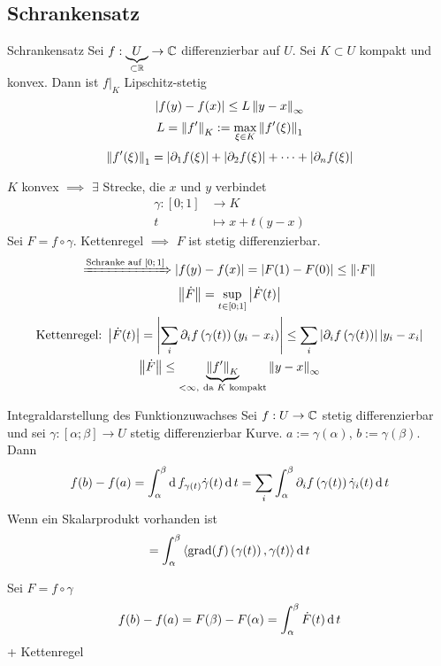 \subsection{Schrankensatz}
\begin{Sat}{Schrankensatz}
  Sei $f:\underbrace{U}_{\subset\mathbb{R}}\to \mathbb{C}$ differenzierbar auf $U$. Sei $K\subset U$ kompakt und konvex. Dann ist $f|_K$ Lipschitz-stetig
  \[\left| f(y)-f(x) \right|\leq L\left\| y-x \right\|_\infty\]
  \[L=\left\| f' \right\|_K:=\max_{\xi\in K}\left\| f'(\xi) \right\|_1\]
  \[\left\| f'(\xi) \right\|_1=\left| \partial_1f(\xi) \right|+\left| \partial_2f(\xi) \right|+\cdots+\left| \partial_n f(\xi) \right|\]
\end{Sat}
\begin{Bew}
  $K$ konvex $\implies$ $\exists$ Strecke, die $x$ und $y$ verbindet
  \begin{align*}
    \gamma:[0;1]&\to K\\
    t&\mapsto x+t(y-x)
  \end{align*}
  Sei $F=f\circ \gamma$. Kettenregel $\implies$ $F$ ist stetig differenzierbar.
  \begin{gather*}
    \xRightarrow{\text{Schranke auf $[0;1]$}} \left| f(y)-f(x) \right|=\left| F(1)-F(0) \right|\leq \left\| \cdot F \right\|\\
    \left\| \dot F \right\|=\sup_{t\in[0;1]}\left| \dot F(t) \right|\\
    \text{Kettenregel:}\ \left| \dot F(t) \right|=\left| \sum_i\partial_if\left( \gamma(t) \right)(y_i-x_i) \right|\leq \sum_i\left| \partial_if\left( \gamma(t) \right) \right|\left| y_i-x_i \right|\\
    \left\| \dot F \right\|\leq \underbrace{\left\| f' \right\|_K}_{<\infty,\ \text{da $K$ kompakt}}\left\| y-x \right\|_\infty
  \end{gather*}
\end{Bew}
\begin{Sat}{Integraldarstellung des Funktionzuwachses}
  Sei $f:U\to\mathbb{C}$ stetig differenzierbar und sei $\gamma:[\alpha;\beta]\to U$ stetig differenzierbar Kurve. $a:=\gamma(\alpha)$, $b:=\gamma(\beta)$. Dann
  \[f(b)-f(a)=\int_\alpha^\beta\operatorname{d} f_{\gamma\left( t \right)}\dot \gamma(t)\operatorname{d} t=\sum_i\int^\beta_\alpha\partial_if\left( \gamma(t) \right)\dot\gamma_i(t)\operatorname{d} t\]
  Wenn ein Skalarprodukt vorhanden ist
  \[=\int^\beta_\alpha \left\langle \operatorname{grad}(f)\left( \gamma(t) \right), \gamma(t) \right\rangle \operatorname{d} t\]
\end{Sat}
\begin{Bew}
  Sei $F=f\circ \gamma$
  \begin{gather*}
    f(b)-f(a)=F(\beta)-F(\alpha)=\int^\beta_\alpha\dot F(t)\operatorname{d} t
  \end{gather*}
  + Kettenregel
\end{Bew}
